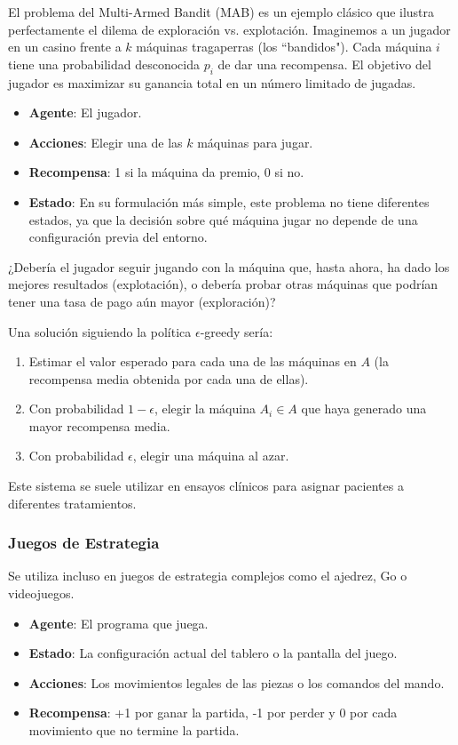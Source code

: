\documentclass[12pt,a4paper]{book}
\begin{document}
El problema del Multi-Armed Bandit (MAB) \cite{MAB} es un ejemplo clásico que ilustra perfectamente el dilema de exploración vs. explotación. Imaginemos a un jugador en un casino frente a $k$ máquinas tragaperras (los ``bandidos").
Cada máquina $i$ tiene una probabilidad desconocida $p_i$ de dar una recompensa. El objetivo del jugador es maximizar su ganancia total en un número limitado de jugadas.

\begin{itemize}
    \item \textbf{Agente}: El jugador.
    \item \textbf{Acciones}: Elegir una de las $k$ máquinas para jugar.
    \item \textbf{Recompensa}: 1 si la máquina da premio, 0 si no.
    \item \textbf{Estado}: En su formulación más simple, este problema no tiene diferentes estados, ya que la decisión sobre qué máquina jugar no depende de una configuración previa del entorno.
\end{itemize}

¿Debería el jugador seguir jugando con la máquina que, hasta ahora, ha dado los mejores resultados (explotación), o debería probar otras máquinas que podrían tener una tasa de pago aún mayor (exploración)?

Una solución siguiendo la política $\epsilon$-greedy sería:
\begin{enumerate}
    \item Estimar el valor esperado para cada una de las máquinas en $A$ (la recompensa media obtenida por cada una de ellas).
    \item Con probabilidad $1-\epsilon$, elegir la máquina $A_i \in A$ que haya generado una mayor recompensa media.
    \item Con probabilidad $\epsilon$, elegir una máquina al azar.
\end{enumerate}

Este sistema se suele utilizar en ensayos clínicos para asignar pacientes a diferentes tratamientos.

\subsubsection{Juegos de Estrategia}

Se utiliza incluso en juegos de estrategia complejos como el ajedrez, Go o videojuegos.

\begin{itemize}
    \item \textbf{Agente}: El programa que juega.
    \item \textbf{Estado}: La configuración actual del tablero o la pantalla del juego.
    \item \textbf{Acciones}: Los movimientos legales de las piezas o los comandos del mando.
    \item \textbf{Recompensa}: +1 por ganar la partida, -1 por perder y 0 por cada movimiento que no termine la partida.
\end{itemize}
\end{document}
